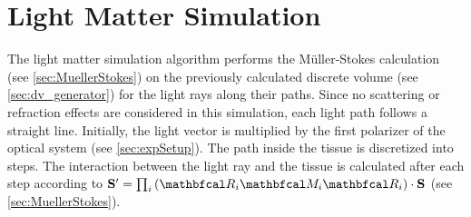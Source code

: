 \section{Light Matter Simulation}
\label{sec:simulation}
%
The light matter simulation algorithm performs the M{\"u}ller-Stokes calculation (see \cref{sec:MuellerStokes}) on the previously calculated discrete volume (see \cref{sec:dv_generator}) for the light rays along their paths.
Since no scattering or refraction effects are considered in this simulation, each light path follows a straight line.
Initially, the light vector is multiplied by the first polarizer of the optical system (see \cref{sec:expSetup}).
The path inside the tissue is discretized into steps.
The interaction between the light ray and the tissue is calculated after each step according to $ \vec{S}' = \prod_i \left(\mat{R}_i \mat{M}_i \mat{R}_i\right) \cdot \vec{S}$ (see \cref{sec:MuellerStokes}).
% 
%
%
